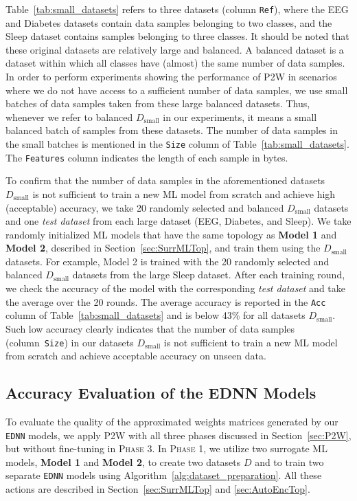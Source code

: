 \documentclass[letterpaper]{article}
\begin{document}
Table~\ref{tab:small_datasets} refers to three datasets (column \texttt{Ref}), where the EEG and  Diabetes datasets contain data samples belonging to two classes, and the Sleep dataset contains samples belonging to three classes. It should be noted that these original datasets are relatively large and balanced. A balanced dataset is a dataset within which all classes have (almost) the same number of data samples. In order to perform experiments showing the performance of P2W in scenarios where we do not have access to a sufficient number of data samples, we use small batches of data samples taken from these large balanced datasets. Thus, whenever we refer to balanced $D_{\text{small}}$ in our experiments, it means a small balanced batch of samples from these datasets. The number of data samples in the small batches is mentioned in the \texttt{Size} column of Table~\ref{tab:small_datasets}. The \texttt{Features} column indicates the length of each sample in bytes. 

To confirm that the number of data samples in the aforementioned datasets $D_{\text{small}}$ 
is not sufficient to train a new ML model from scratch and achieve high (acceptable) accuracy, 
we take 20 randomly selected and balanced $D_{\text{small}}$ datasets and one \emph{test dataset} from each large dataset (EEG, Diabetes, and Sleep). 
We take randomly initialized ML models that have the same topology as \textbf{Model 1} and \textbf{Model 2}, described in Section~\ref{sec:SurrMLTop}, and train them using the $D_{\text{small}}$ datasets. For example, Model 2 is trained with the 20 randomly selected and balanced $D_{\text{small}}$ datasets from the large Sleep dataset. After each training round, we check the accuracy of the model with the corresponding \emph{test dataset} and take the average over the 20 rounds. The average accuracy is reported in the \texttt{Acc} column of Table~\ref{tab:small_datasets} and is below 43\% for all datasets $D_{\text{small}}$. Such low accuracy clearly indicates that the number of data samples (column~\texttt{Size}) in our datasets $D_{\text{small}}$ is not sufficient to train a new ML model from scratch and achieve acceptable accuracy on unseen data. 



\subsection{Accuracy Evaluation of the EDNN Models}
\label{sec:AutoEncEval}
        
To evaluate the quality of the approximated weights matrices generated by our \texttt{EDNN} models, we apply P2W with all three phases discussed in Section~\ref{sec:P2W}, but without fine-tuning in \textsc{Phase 3}. In \textsc{Phase 1}, we utilize two surrogate ML models, \textbf{Model 1} and \textbf{Model 2}, to create two datasets $D$ and to train two separate \texttt{EDNN} models using Algorithm~\ref{alg:dataset_preparation}. All these actions are described in Section~\ref{sec:SurrMLTop} and \ref{sec:AutoEncTop}.
\end{document}
